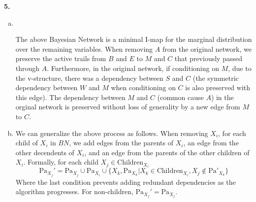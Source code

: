 \documentclass{article}
\begin{document}
\textbf{5.} \begin{enumerate}[(a)]
    \item \textcolor{white}{{s}}\begin{center}
    \end{center}
    The above Bayesian Network is a minimal I-map for the marginal distribution over the remaining variables. When removing $A$ from the original network, we preserve the active trails from $B$ and $E$ to $M$ and $C$ that previously passed through $A$. Furthermore, in the original network, if conditioning on $M$, due to the v-structure, there was a dependency between $S$ and $C$ (the symmetric dependency between $W$ and $M$ when conditioning on $C$ is also preserved with this edge). The dependency between $M$ and $C$ (common cause $A$) in the orginal network is preserved without loss of generality by a new edge from $M$ to $C$. 
    \item We can generalize the above process as follows. When removing $X_i$, for each child of $X_i$ in $BN$, we add edges from the parents of $X_i$, an edge from the other decendents of $X_i$, and an edge from the parents of the other children of $X_i$. Formally, for each child $X_j \in \text{Children}_{X_i}$ \begin{equation*}
        \text{Pa}_{X_j}' = \text{Pa}_{X_j} \cup \text{Pa}_{X_i} \cup \{X_k, \text{Pa}_{X_k} | X_k \in \text{Children}_{X_i}, X_j \notin \text{Pa}'_{X_k}\}
    \end{equation*}
    Where the last condition prevents adding redundant dependencies as the algorithm progresses. For non-children, $\text{Pa}_{X_j}' = \text{Pa}_{X_j}$. 
\end{enumerate}
\end{document}
